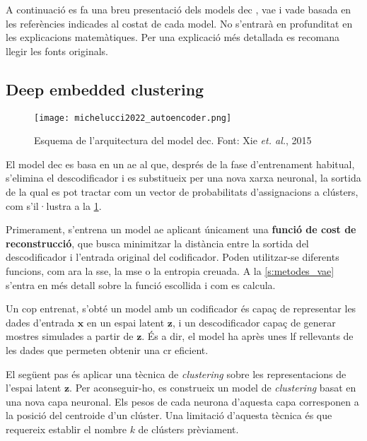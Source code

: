 \documentclass[CAT,BIB]{TFUOC}%
\begin{document}
    A continuació es fa una breu presentació dels models
    \gls{dec} \citep{Xie2015}, \gls{vae} \citep{Kingma2014,Kingma2019} i \gls{vade} \citep{Jiang2020}
    basada en les referències indicades al costat de cada model.
    No s'entrarà en profunditat en les explicacions matemàtiques.
    Per una explicació més detallada es recomana llegir les fonts originals.


    \subsection{Deep embedded clustering}
    \label{s:metodes_dec}

        \begin{figure}
            \centering
            \texttt{[image: michelucci2022\_autoencoder.png]}
            \caption[Arquitectura del model DEC mantenint]{
                Esquema de l'arquitectura del model \gls{dec}.
                Font: Xie \textit{et. al.}, 2015 \citep{xie2015_dec}
            }
            \label{f:dec_xie2015}
        \end{figure}

        El model \gls{dec} es basa en un \gls{ae}
        al que, després de la fase d'entrenament habitual,
        s'elimina el descodificador i
        es substitueix per una nova xarxa neuronal,
        la sortida de la qual es pot tractar
        com un vector de probabilitats d'assignacions a clústers,
        com s'il·lustra a la \cref{f:dec_xie2015}.

        Primerament,
        s'entrena un model \gls{ae}
        aplicant únicament una \textbf{funció de cost de reconstrucció},
        que busca minimitzar la distància entre la sortida del descodificador
        i l'entrada original del codificador.
        Poden utilitzar-se diferents funcions,
        com ara la \gls{sse},
        la \gls{mse}
        o la entropia creuada.
        A la \cref{s:metodes_vae} s'entra en més detall
        sobre la funció escollida i com es calcula.

        Un cop entrenat,
        s'obté un model amb un codificador
        és capaç de representar les dades d'entrada $\mathbf{x}$
        en un espai latent $\mathbf{z}$,
        i un descodificador capaç de generar mostres simulades
        a partir de $\mathbf{z}$.
        És a dir, el model ha après unes \gls{lf} rellevants de les dades
        que permeten obtenir una \gls{cr} eficient.

        El següent pas és aplicar una tècnica de \textit{clustering}
        sobre les representacions de l'espai latent $\mathbf{z}$.
        Per aconseguir-ho,
        es construeix un model de \textit{clustering}
        basat en una nova capa neuronal.
        Els pesos de cada neurona d'aquesta capa
        corresponen a la posició del centroide d'un clúster.
        Una limitació d'aquesta tècnica és que requereix
        establir el nombre $k$ de clústers prèviament.
\end{document}
